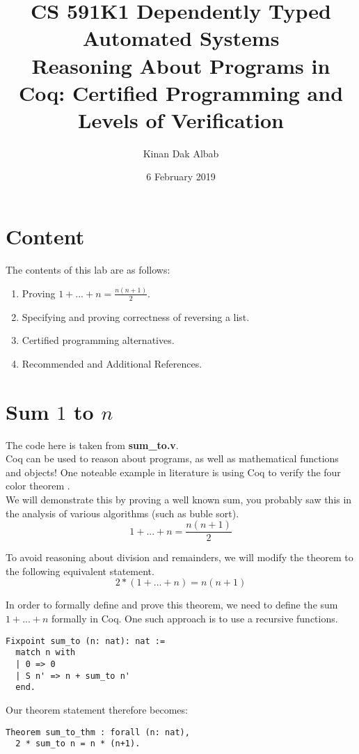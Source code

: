 \documentclass{article}
\title{CS 591K1 Dependently Typed Automated Systems\\
Reasoning About Programs in Coq: Certified Programming and Levels of Verification}
\author{Kinan Dak Albab}
\date{6 February 2019}
\begin{document}
\maketitle

\section {Content}
The contents of this lab are as follows:
\begin{enumerate}
    \item Proving $1 + ... + n = \frac{n(n+1)}{2}$.
    \item Specifying and proving correctness of reversing a list.
    \item Certified programming alternatives.
    \item Recommended and Additional References.
\end{enumerate}

\section{Sum $1$ to $n$}

The code here is taken from \textbf{sum\_to.v}. \\

\noindent Coq can be used to reason about programs, as well as mathematical functions and objects! One noteable
example in literature is using Coq to verify the four color theorem \cite{gonthier2008formal}. \\

We will demonstrate this by proving a well known sum, you probably saw this in the analysis of various
algorithms (such as buble sort).
$$ 1 + ... + n = \frac{n(n+1)}{2}$$

To avoid reasoning about division and remainders, we will modify the theorem
to the following equivalent statement.
$$ 2*(1 + ... + n) = n(n+1)$$

In order to formally define and prove this theorem, we need to define the sum $1 + ... + n$ 
formally in Coq. One such approach is to use a recursive functions.
\begin{verbatim}
Fixpoint sum_to (n: nat): nat :=
  match n with
  | 0 => 0
  | S n' => n + sum_to n'
  end.
\end{verbatim}

\noindent Our theorem statement therefore becomes:
\begin{verbatim}
Theorem sum_to_thm : forall (n: nat),
  2 * sum_to n = n * (n+1).
\end{verbatim}
\end{document}
